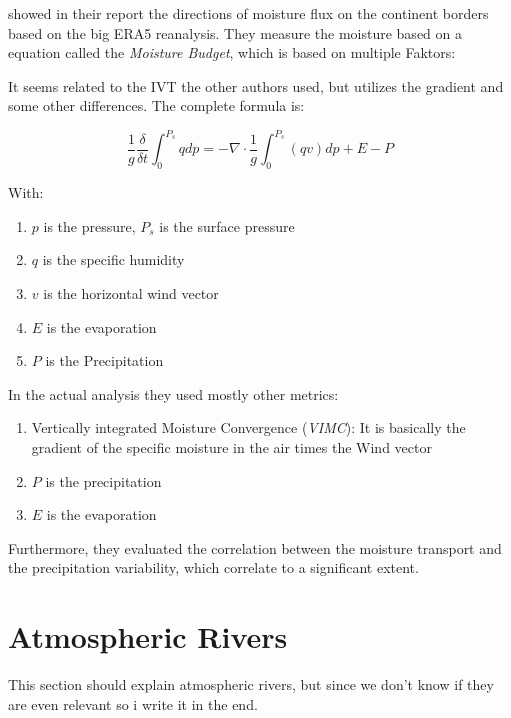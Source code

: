\citeauthor{yang_moisture_2022} showed in their report \cite{yang_moisture_2022} the directions of moisture flux on the continent borders based on the big ERA5 reanalysis.
They measure the moisture based on a equation called the \textit{Moisture Budget}, which is based on multiple Faktors: 



It seems related to the IVT the other authors used, but utilizes the gradient and some other differences. The complete formula is:

$$
\frac{1}{g} \frac{\delta}{\delta t} \int^{P_s}_0 q dp = - \nabla \cdot \frac{1}{g} \int^{P_s}_0 (qv) dp + E - P
$$

With: 

\begin{enumerate}
  \item $p$ is the pressure, $P_s$ is the surface pressure
  \item $q$ is the specific humidity
  \item $v$ is the horizontal wind vector
  \item $E$ is the evaporation
  \item $P$ is the Precipitation
\end{enumerate}


In the actual analysis they used mostly other metrics:


\begin{enumerate}
  \item Vertically integrated Moisture Convergence (\textit{VIMC}): It is basically the gradient of the specific moisture in the air times the Wind vector
  \item $P$ is the precipitation 
  \item $E$ is the evaporation
\end{enumerate}

Furthermore, they evaluated the correlation between the moisture transport and the precipitation variability, which correlate to a significant extent.

\section{Atmospheric Rivers}
\label{sec:atmo-rivers}


This section should explain atmospheric rivers, but since we don't know if they are even relevant so i write it in the end. 

